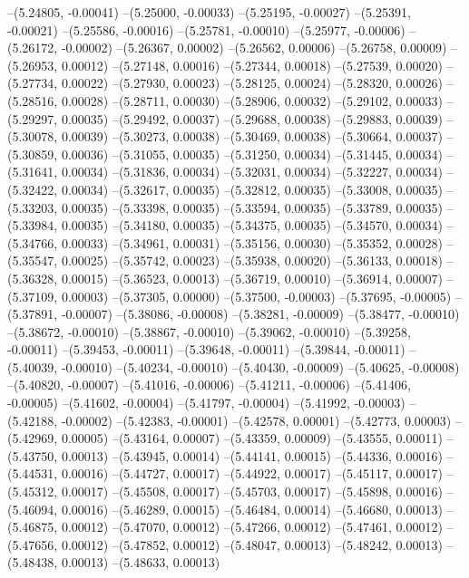 --(5.24805, -0.00041)
--(5.25000, -0.00033)
--(5.25195, -0.00027)
--(5.25391, -0.00021)
--(5.25586, -0.00016)
--(5.25781, -0.00010)
--(5.25977, -0.00006)
--(5.26172, -0.00002)
--(5.26367, 0.00002)
--(5.26562, 0.00006)
--(5.26758, 0.00009)
--(5.26953, 0.00012)
--(5.27148, 0.00016)
--(5.27344, 0.00018)
--(5.27539, 0.00020)
--(5.27734, 0.00022)
--(5.27930, 0.00023)
--(5.28125, 0.00024)
--(5.28320, 0.00026)
--(5.28516, 0.00028)
--(5.28711, 0.00030)
--(5.28906, 0.00032)
--(5.29102, 0.00033)
--(5.29297, 0.00035)
--(5.29492, 0.00037)
--(5.29688, 0.00038)
--(5.29883, 0.00039)
--(5.30078, 0.00039)
--(5.30273, 0.00038)
--(5.30469, 0.00038)
--(5.30664, 0.00037)
--(5.30859, 0.00036)
--(5.31055, 0.00035)
--(5.31250, 0.00034)
--(5.31445, 0.00034)
--(5.31641, 0.00034)
--(5.31836, 0.00034)
--(5.32031, 0.00034)
--(5.32227, 0.00034)
--(5.32422, 0.00034)
--(5.32617, 0.00035)
--(5.32812, 0.00035)
--(5.33008, 0.00035)
--(5.33203, 0.00035)
--(5.33398, 0.00035)
--(5.33594, 0.00035)
--(5.33789, 0.00035)
--(5.33984, 0.00035)
--(5.34180, 0.00035)
--(5.34375, 0.00035)
--(5.34570, 0.00034)
--(5.34766, 0.00033)
--(5.34961, 0.00031)
--(5.35156, 0.00030)
--(5.35352, 0.00028)
--(5.35547, 0.00025)
--(5.35742, 0.00023)
--(5.35938, 0.00020)
--(5.36133, 0.00018)
--(5.36328, 0.00015)
--(5.36523, 0.00013)
--(5.36719, 0.00010)
--(5.36914, 0.00007)
--(5.37109, 0.00003)
--(5.37305, 0.00000)
--(5.37500, -0.00003)
--(5.37695, -0.00005)
--(5.37891, -0.00007)
--(5.38086, -0.00008)
--(5.38281, -0.00009)
--(5.38477, -0.00010)
--(5.38672, -0.00010)
--(5.38867, -0.00010)
--(5.39062, -0.00010)
--(5.39258, -0.00011)
--(5.39453, -0.00011)
--(5.39648, -0.00011)
--(5.39844, -0.00011)
--(5.40039, -0.00010)
--(5.40234, -0.00010)
--(5.40430, -0.00009)
--(5.40625, -0.00008)
--(5.40820, -0.00007)
--(5.41016, -0.00006)
--(5.41211, -0.00006)
--(5.41406, -0.00005)
--(5.41602, -0.00004)
--(5.41797, -0.00004)
--(5.41992, -0.00003)
--(5.42188, -0.00002)
--(5.42383, -0.00001)
--(5.42578, 0.00001)
--(5.42773, 0.00003)
--(5.42969, 0.00005)
--(5.43164, 0.00007)
--(5.43359, 0.00009)
--(5.43555, 0.00011)
--(5.43750, 0.00013)
--(5.43945, 0.00014)
--(5.44141, 0.00015)
--(5.44336, 0.00016)
--(5.44531, 0.00016)
--(5.44727, 0.00017)
--(5.44922, 0.00017)
--(5.45117, 0.00017)
--(5.45312, 0.00017)
--(5.45508, 0.00017)
--(5.45703, 0.00017)
--(5.45898, 0.00016)
--(5.46094, 0.00016)
--(5.46289, 0.00015)
--(5.46484, 0.00014)
--(5.46680, 0.00013)
--(5.46875, 0.00012)
--(5.47070, 0.00012)
--(5.47266, 0.00012)
--(5.47461, 0.00012)
--(5.47656, 0.00012)
--(5.47852, 0.00012)
--(5.48047, 0.00013)
--(5.48242, 0.00013)
--(5.48438, 0.00013)
--(5.48633, 0.00013)
